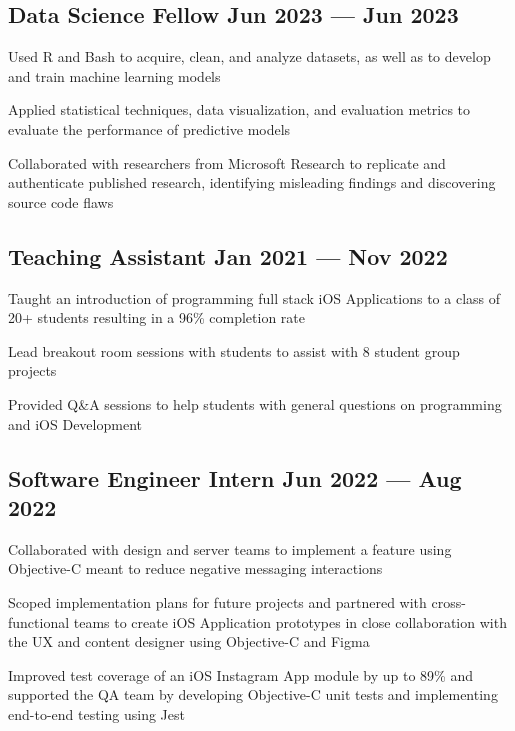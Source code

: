 \subsection{{Data Science Fellow \hfill Jun 2023 --- Jun 2023}}
\begin{zitemize}
\item Used R and Bash to acquire, clean, and analyze datasets, as well as to develop and train machine learning models
\item Applied statistical techniques, data visualization, and evaluation metrics to evaluate the performance of predictive models
\item Collaborated with researchers from Microsoft Research to replicate and authenticate published research, identifying misleading findings and discovering source code flaws
\end{zitemize}

\subsection{{Teaching Assistant \hfill Jan 2021 --- Nov 2022}}
\begin{zitemize}
\item Taught an introduction of programming full stack iOS Applications to a class of 20+ students resulting in a 96\% completion rate
\item Lead breakout room sessions with students to assist with 8 student group projects
\item Provided Q\&A sessions to help students with general questions on programming and iOS Development
\end{zitemize}


\subsection{{Software Engineer Intern \hfill Jun 2022 --- Aug 2022}}
\begin{zitemize}
\item Collaborated with design and server teams to implement a feature using Objective-C meant to reduce negative messaging interactions
\item Scoped implementation plans for future projects and partnered with cross-functional teams to create iOS Application prototypes in close collaboration with the UX and content designer using Objective-C and Figma
\item Improved test coverage of an iOS Instagram App module by up to 89\% and supported the QA team by developing Objective-C unit tests and implementing end-to-end testing using Jest
\end{zitemize}

